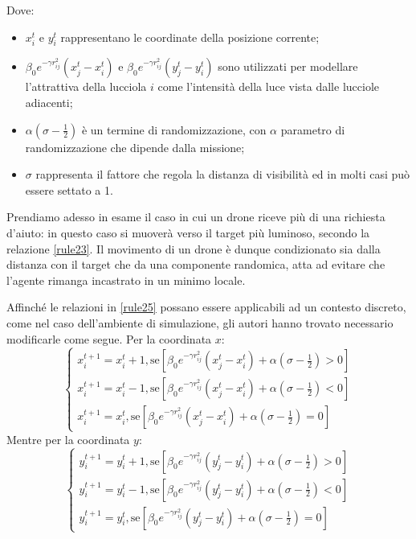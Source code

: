 Dove:
\begin{itemize}
    \item $x_{i}^{t}$ e $y_{i}^{t}$ rappresentano le coordinate della posizione corrente;
    \item $\beta_{0} e^{- \gamma r_{ij}^{2}} (x_{j}^{t} - x_{i}^{t})$ e $\beta_{0} e^{- \gamma r_{ij}^{2}} (y_{j}^{t} - y_{i}^{t})$ sono utilizzati per modellare l'attrattiva della lucciola $i$ come l'intensità della luce vista dalle lucciole adiacenti;
    \item $\alpha(\sigma - \frac{1}{2})$ è un termine di randomizzazione, con $\alpha$ parametro di randomizzazione che dipende dalla missione;
    \item $\sigma$ rappresenta il fattore che regola la distanza di visibilità ed in molti casi può essere settato a 1.
\end{itemize}

Prendiamo adesso in esame il caso in cui un drone riceve più di una richiesta d'aiuto: in questo caso si muoverà verso il target più luminoso, secondo la relazione \ref{rule23}.
Il movimento di un drone è dunque condizionato sia dalla distanza con il target che da una componente randomica, atta ad evitare che l'agente rimanga incastrato in un minimo locale.

Affinché le relazioni in \ref{rule25} possano essere applicabili ad un contesto discreto, come nel caso dell'ambiente di simulazione, gli autori hanno trovato necessario modificarle come segue.
Per la coordinata $x$:
\begin{equation}
    \begin{cases}
        x_{i}^{t+1} = x_{i}^{t} + 1 , \text{se}[\beta_{0} e^{- \gamma r_{ij}^{2}} (x_{j}^{t} - x_{i}^{t}) + \alpha(\sigma - \frac{1}{2}) > 0]\\
        x_{i}^{t+1} = x_{i}^{t} - 1 , \text{se}[\beta_{0} e^{- \gamma r_{ij}^{2}} (x_{j}^{t} - x_{i}^{t}) + \alpha(\sigma - \frac{1}{2}) < 0]\\
        x_{i}^{t+1} = x_{i}^{t} , \text{se}[\beta_{0} e^{- \gamma r_{ij}^{2}} (x_{j}^{t} - x_{i}^{t}) + \alpha(\sigma - \frac{1}{2}) = 0]
    \end{cases}
\end{equation}
Mentre per la coordinata $y$:
\begin{equation}
    \begin{cases}
        y_{i}^{t+1} = y_{i}^{t} + 1 , \text{se}[\beta_{0} e^{- \gamma r_{ij}^{2}} (y_{j}^{t} - y_{i}^{t}) + \alpha(\sigma - \frac{1}{2}) > 0]\\
        y_{i}^{t+1} = y_{i}^{t} - 1 , \text{se}[\beta_{0} e^{- \gamma r_{ij}^{2}} (y_{j}^{t} - y_{i}^{t}) + \alpha(\sigma - \frac{1}{2}) < 0]\\
        y_{i}^{t+1} = y_{i}^{t} , \text{se}[\beta_{0} e^{- \gamma r_{ij}^{2}} (y_{j}^{t} - y_{i}^{t}) + \alpha(\sigma - \frac{1}{2}) = 0]
    \end{cases}
\end{equation}

